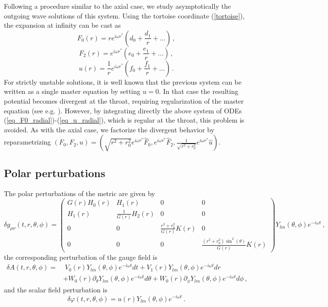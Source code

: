 \documentclass[11pt,a4paper]{article}
\begin{document}
Following a procedure similar to the axial case, we study asymptotically the outgoing wave solutions of this system. Using the tortoise coordinate (\ref{tortoise}),
the expansion at infinity can be cast as
%
\begin{equation}
    F_0(r)=re^{i\omega r^*}\left(d_0+\frac{d_1}{r}+\dots\right) \,,
\end{equation}
%
\begin{equation}
    F_2(r)=e^{i\omega r^*}\left(e_0+\frac{e_1}{r}+\dots\right) \,,
\end{equation}
%
\begin{equation}
    u(r)=\frac{1}{r}e^{i\omega r^*}\left(f_0+\frac{f_1}{r}+\dots\right) \,.
\end{equation}
%
For strictly unstable solutions, it is well known that the previous system can be written as a single master equation by setting $u=0$.
In that case the resulting potential becomes divergent at the throat, requiring regularization of the master equation (see e.g. \cite{Gonzalez:2009hn, Bronnikov:2012ch, Torii:2013xba}). 
However, by integrating directly the above system of ODEs (\ref{eq_F0_radial})-(\ref{eq_u_radial}), which is regular at the throat, this problem is avoided. 
As with the axial case, we factorize the divergent behavior by reparametrizing $(F_0, F_2, u)=(\sqrt{r^2+r_0^2}e^{i\omega r^*}\hat{F}_0, e^{i\omega r^*}\hat{F}_2, \frac{1}{\sqrt{r^2+r_0^2}}e^{i\omega r^*}\hat{u})$.


\subsection{Polar perturbations}


The polar perturbations of the metric are given by
%
\begin{equation}
    \delta g_{\mu\nu}(t,r,\theta,\phi)=\begin{pmatrix}
G(r)H_0(r) & H_1(r) & 0 & 0\\
H_1(r) & \frac{1}{G(r)}H_2(r) & 0 & 0\\
0 & 0 & \frac{r^2+r_0^2}{G(r)}K(r) & 0\\
0 & 0 & 0 & \frac{(r^2+r_0^2)\sin^2(\theta)}{G(r)}K(r)
\end{pmatrix}Y_{lm}(\theta,\phi)e^{-i\omega t} \,,
\end{equation}
the corresponding perturbation of the gauge field is
%
\begin{equation}\label{deltaA_polar}
\begin{split}
    \delta A(t,r,\theta,\phi)= &\;V_0(r)Y_{lm}(\theta,\phi)e^{-i\omega t}dt+V_1(r)Y_{lm}(\theta,\phi)e^{-i\omega t}dr\\
    & +W_0(r)\partial_{\theta}Y_{lm}(\theta,\phi)e^{-i\omega t}d\theta+W_0(r)\partial_{\phi}Y_{lm}(\theta,\phi)e^{-i\omega t}d\phi \,, 
\end{split}
\end{equation}
and the scalar field perturbation is
\begin{equation}
    \delta\varphi(t,r,\theta,\phi)=u(r)Y_{lm}(\theta,\phi)e^{-i\omega t} \,.
\end{equation}
\end{document}
